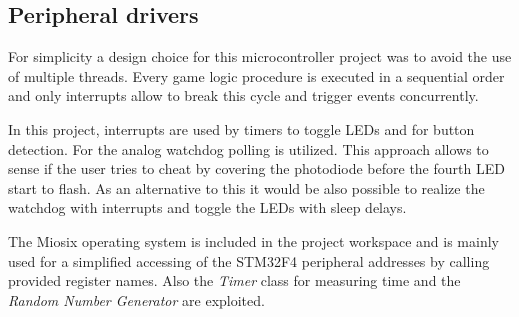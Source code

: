 \subsection{Peripheral drivers}
For simplicity a design choice for this microcontroller project was to avoid the use of multiple threads. Every game logic procedure is executed in a sequential order and only interrupts allow to break this cycle and trigger events concurrently.\\
\par
In this project, interrupts are used by timers to toggle LEDs and for button detection. For the analog watchdog polling is utilized.
This approach allows to sense if the user tries to cheat by covering the photodiode before the fourth LED start to flash. As an alternative to this it would be also possible to realize the watchdog with interrupts and toggle the LEDs with sleep delays.\\
\par
The Miosix operating system \cite{Miosix} is included in the project workspace and is mainly used for a simplified accessing of the STM32F4 peripheral addresses by calling provided register names. Also the \emph{Timer} class for measuring time and the \emph{Random Number Generator} are exploited.

